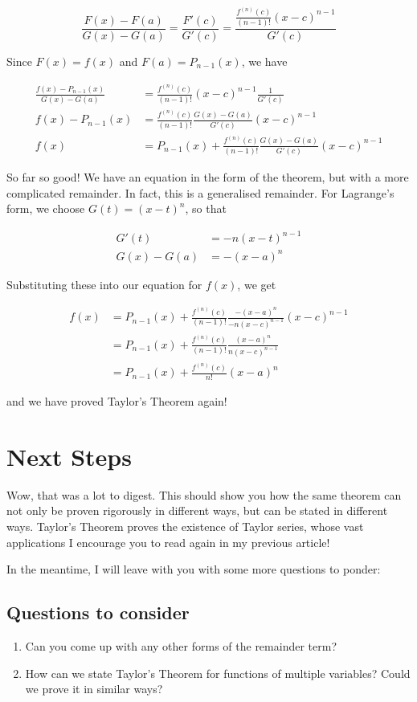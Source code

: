 \documentclass{article}
\begin{document}
$$
\frac{F(x) - F(a)}{G(x) - G(a)} = \frac{F'(c)}{G'(c)} = \frac{\frac{f^{(n)}(c)}{(n-1)!} (x-c)^{n-1}}{G'(c)}
$$

Since $F(x) = f(x)$ and $F(a) = P_{n-1}(x)$, we have

\begin{align*}
    \frac{f(x) - P_{n-1}(x)}{G(x) - G(a)} &= \frac{f^{(n)}(c)}{(n-1)!} (x-c)^{n-1} \frac{1}{G'(c)} \\
    f(x) - P_{n-1}(x) &= \frac{f^{(n)}(c)}{(n-1)!} \frac{G(x) - G(a)}{G'(c)} (x-c)^{n-1}  \\
    f(x) &= P_{n-1}(x) + \frac{f^{(n)}(c)}{(n-1)!} \frac{G(x) - G(a)}{G'(c)} (x-c)^{n-1}
\end{align*}

So far so good! We have an equation in the form of the theorem, but with a more complicated remainder. In fact, this is a generalised remainder. For Lagrange's form, we choose $G(t) = (x-t)^n$, so that

\begin{align*}
    G'(t) &= -n(x-t)^{n-1} \\
    G(x) - G(a) &= -(x-a)^n
\end{align*}

Substituting these into our equation for $f(x)$, we get

\begin{align*}
    f(x) &= P_{n-1}(x) + \frac{f^{(n)}(c)}{(n-1)!} \frac{-(x-a)^n}{-n(x-c)^{n-1}} (x-c)^{n-1} \\
    &= P_{n-1}(x) + \frac{f^{(n)}(c)}{(n-1)!} \frac{(x-a)^n}{n(x-c)^{n-1}} \\
    &= P_{n-1}(x) + \frac{f^{(n)}(c)}{n!} (x-a)^n
\end{align*}

and we have proved Taylor's Theorem again!

\newpage
\section*{Next Steps}

Wow, that was a lot to digest. This should show you how the same theorem can not only be proven rigorously in different ways, but can be stated in different ways. Taylor's Theorem proves the existence of Taylor series, whose vast applications I encourage you to read again in my previous article!

In the meantime, I will leave with you with some more questions to ponder:

\subsection*{Questions to consider}

\begin{enumerate}
    \item Can you come up with any other forms of the remainder term?
    \item How can we state Taylor's Theorem for functions of multiple variables? Could we prove it in similar ways?
\end{enumerate}
\end{document}
